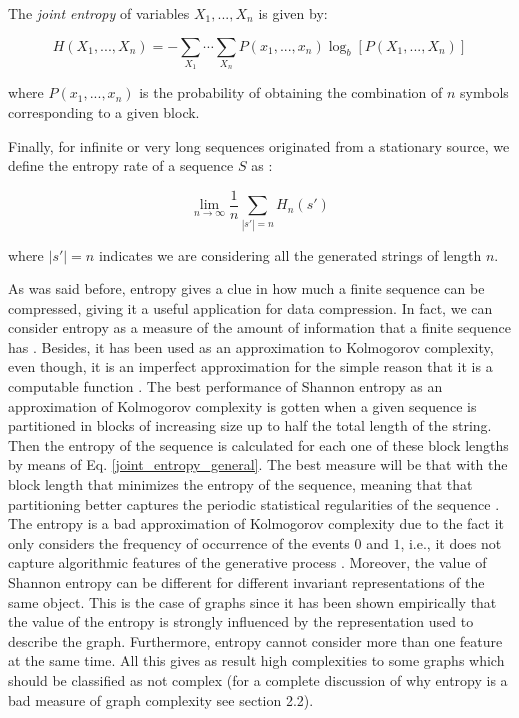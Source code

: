 \begin{defn}
The \textit{joint entropy} of variables $X_{1},...,X_{n}$ is given by:

\begin{equation}
\label{joint_entropy_general}
  H(X_{1},...,X_{n})=-\sum_{X_{1}} \cdots \sum_{X_{n}} P(x_{1},...,x_{n}) \log_{b} [P(X_{1},...,X_{n})]
\end{equation}

where $P(x_{1},...,x_{n})$ is the probability of obtaining the combination of $n$ symbols corresponding to a given block.\\
\end{defn}

Finally, for infinite or very long sequences originated from a stationary source, we define the entropy rate of a sequence $S$ as \cite{decomposition}:

\begin{defn}

\begin{equation}
  \lim_{n\to\infty} \frac{1}{n} \sum_{|s'|=n} H_{n}(s')
\end{equation}

where $|s'|=n$ indicates we are considering all the generated strings of length $n$.\\
\end{defn}

As was said before, entropy gives a clue in how much a finite sequence can be compressed, giving it a useful application for data compression. In fact, we can consider entropy as a measure of the amount of information that a finite sequence has \cite{decomposition}. Besides, it has been used as an approximation to Kolmogorov complexity, even though, it is an imperfect approximation for the simple reason that it is a computable function \cite{decomposition}. The best performance of Shannon entropy as an approximation of Kolmogorov complexity is gotten when a given sequence is partitioned in blocks of increasing size up to half the total length of the string. Then the entropy of the sequence is calculated for each one of these block lengths by means of Eq. \ref{joint_entropy_general}. The best measure will be that with the block length that minimizes the entropy of the sequence, meaning that that partitioning better captures the periodic statistical regularities of the sequence \cite{decomposition}.\\

The entropy is a bad approximation of Kolmogorov complexity due to the fact it only considers the frequency of occurrence of the events $0$ and $1$, i.e., it does not capture algorithmic features of the generative process \cite{faibles_complexites}. Moreover, the value of Shannon entropy can be different for different invariant representations of the same object. This is the case of graphs since it has been shown empirically that the value of the entropy is strongly influenced by the representation used to describe the graph. Furthermore, entropy cannot consider more than one feature at the same time. All this gives as result high complexities to some graphs which should be classified as not complex (for a complete discussion of why entropy is a bad measure of graph complexity see \cite{kolmo_graph} section 2.2).


